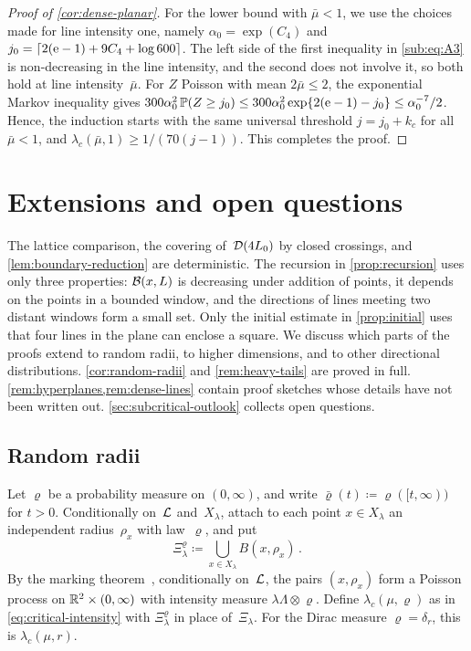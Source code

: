 \documentclass[11pt,letterpaper]{article}
\begin{document}
\begin{proof}[Proof of \cref{cor:dense-planar}]
For the lower bound with $\bar\mu<1$, we use the choices made for line intensity one, namely $\alpha_0=\exp(C_4)$ and $j_0=\lceil2(\mathrm{e}-1)+9C_4+\log600\rceil$. The left side of the first inequality in \eqref{sub:eq:A3} is non-decreasing in the line intensity, and the second does not involve it, so both hold at line intensity~$\bar\mu$. For $Z$ Poisson with mean $2\bar\mu\le2$, the exponential Markov inequality gives $300\alpha_0^2\,\mathbb P(Z\ge j_0)\le300\alpha_0^2\exp\{2(\mathrm{e}-1)-j_0\}\le\alpha_0^{-7}/2$. Hence, the induction starts with the same universal threshold $j=j_0+k_c$ for all $\bar\mu<1$, and $\lambda_c(\bar\mu,1)\ge1/(70(j-1))$. This completes the proof.
\end{proof}

\section{Extensions and open questions}
\label{sec:extensions}

The lattice comparison, the covering of~$\mathcal D(4L_0)$ by closed crossings, and \cref{lem:boundary-reduction} are deterministic. The recursion in \cref{prop:recursion} uses only three properties: $\mathcal B(x,L)$ is decreasing under addition of points, it depends on the points in a bounded window, and the directions of lines meeting two distant windows form a small set. Only the initial estimate in \cref{prop:initial} uses that four lines in the plane can enclose a square. We discuss which parts of the proofs extend to random radii, to higher dimensions, and to other directional distributions. \cref{cor:random-radii} and \cref{rem:heavy-tails} are proved in full. \cref{rem:hyperplanes,rem:dense-lines} contain proof sketches whose details have not been written out. \cref{sec:subcritical-outlook} collects open questions.

\subsection{Random radii}
\label{sec:random-radii}

Let $\varrho$ be a probability measure on $(0,\infty)$, and write $\bar\varrho(t)\coloneqq\varrho([t,\infty))$ for $t>0$. Conditionally on~$\mathcal L$ and~$X_\lambda$, attach to each point $x\in X_\lambda$ an independent radius~$\rho_x$ with law~$\varrho$, and put
\begin{equation*}
  \Xi_\lambda^\varrho\coloneqq\bigcup_{x\in X_\lambda}B(x,\rho_x)\,.
\end{equation*}
By the marking theorem~\cite[Theorem~5.6]{LP17}, conditionally on~$\mathcal L$, the pairs $(x,\rho_x)$ form a Poisson process on $\mathbb R^2\times(0,\infty)$ with intensity measure $\lambda\Lambda\otimes\varrho$. Define $\lambda_c(\mu,\varrho)$ as in \eqref{eq:critical-intensity} with $\Xi_\lambda^\varrho$ in place of~$\Xi_\lambda$. For the Dirac measure $\varrho=\delta_r$, this is $\lambda_c(\mu,r)$.
\end{document}

